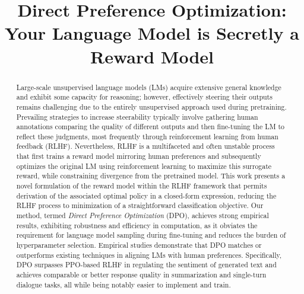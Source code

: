 \title{Direct Preference Optimization: Your Language Model is Secretly a Reward Model}

\begin{abstract}
Large-scale unsupervised language models (LMs) acquire extensive general knowledge and exhibit some capacity for reasoning; however, effectively steering their outputs remains challenging due to the entirely unsupervised approach used during pretraining. Prevailing strategies to increase steerability typically involve gathering human annotations comparing the quality of different outputs and then fine-tuning the LM to reflect these judgments, most frequently through reinforcement learning from human feedback (RLHF). Nevertheless, RLHF is a multifaceted and often unstable process that first trains a reward model mirroring human preferences and subsequently optimizes the original LM using reinforcement learning to maximize this surrogate reward, while constraining divergence from the pretrained model. This work presents a novel formulation of the reward model within the RLHF framework that permits derivation of the associated optimal policy in a closed-form expression, reducing the RLHF process to minimization of a straightforward classification objective. Our method, termed \textit{Direct Preference Optimization} (DPO), achieves strong empirical results, exhibiting robustness and efficiency in computation, as it obviates the requirement for language model sampling during fine-tuning and reduces the burden of hyperparameter selection. Empirical studies demonstrate that DPO matches or outperforms existing techniques in aligning LMs with human preferences. Specifically, DPO surpasses PPO-based RLHF in regulating the sentiment of generated text and achieves comparable or better response quality in summarization and single-turn dialogue tasks, all while being notably easier to implement and train.
\end{abstract}


